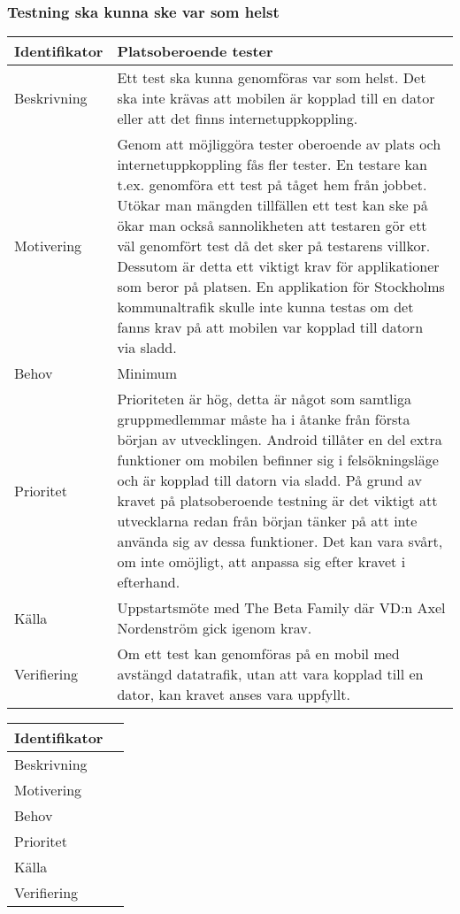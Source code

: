 \subsubsection{Testning ska kunna ske var som helst}
\begin{tabular}{ | p{65pt} | p{300pt} |}
  \hline
  Identifikator & 
  Platsoberoende tester
  \\ \hline
  Beskrivning & 
  Ett test ska kunna genomföras var som helst. Det ska inte krävas att mobilen är kopplad till en dator eller att det finns internetuppkoppling.
  \\ \hline
  Motivering &
  Genom att möjliggöra tester oberoende av plats och internetuppkoppling fås fler tester. En testare kan t.ex. genomföra ett test på tåget hem från jobbet. Utökar man mängden tillfällen ett test kan ske på ökar man också sannolikheten att testaren gör ett väl genomfört test då det sker på testarens villkor. Dessutom är detta ett viktigt krav för applikationer som beror på platsen. En applikation för Stockholms kommunaltrafik skulle inte kunna testas om det fanns krav på att mobilen var kopplad till datorn via sladd.
  \\ \hline
  Behov &
Minimum
  \\ \hline
  Prioritet &
Prioriteten är hög, detta är något som samtliga gruppmedlemmar måste ha i åtanke från första början av utvecklingen. Android tillåter en del extra funktioner om mobilen befinner sig i felsökningsläge och är kopplad till datorn via sladd. På grund av kravet på platsoberoende testning är det viktigt att utvecklarna redan från början tänker på att inte använda sig av dessa funktioner. Det kan vara svårt, om inte omöjligt, att anpassa sig efter kravet i efterhand.
  \\ \hline
  Källa &
 Uppstartsmöte med The Beta Family där VD:n Axel Nordenström gick igenom krav.
  \\ \hline
  Verifiering &
  Om ett test kan genomföras på en mobil med avstängd datatrafik, utan att vara kopplad till en dator, kan kravet anses vara uppfyllt.
  \\ \hline
\end{tabular}

\begin{tabular}{ | p{65pt} | p{300pt} |}
  \hline
  Identifikator &
  \\ \hline
  Beskrivning & 
  \\ \hline
  Motivering &
  \\ \hline
  Behov &
  \\ \hline
  Prioritet &
  \\ \hline
  Källa &
  \\ \hline
  Verifiering &
  \\ \hline
\end{tabular}
